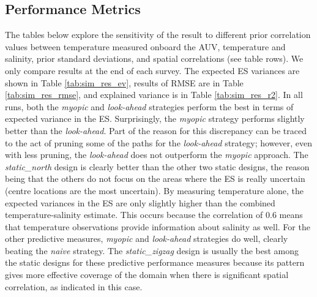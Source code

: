 \documentclass[aoas]{imsart}
\begin{document}
\subsection{Performance Metrics}

The tables below explore the sensitivity of the result to different
prior correlation values between temperature measured onboard the AUV,
temperature and salinity, prior standard deviations, and spatial
correlations (see table rows). We only compare results at the end of
each survey. The expected ES variances are shown in Table
\ref{tab:sim_res_ev}, results of RMSE are in Table
\ref{tab:sim_res_rmse}, and explained variance is in Table
\ref{tab:sim_res_r2}. In all runs, both the \textit{myopic} and
\textit{look-ahead} strategies perform the best in terms of expected
variance in the ES. Surprisingly, the \textit{myopic} strategy
performs slightly better than the \textit{look-ahead}. Part of the
reason for this discrepancy can be traced to the act of pruning some
of the paths for the \textit{look-ahead} strategy; however, even with
less pruning, the \textit{look-ahead} does not outperform the
\textit{myopic} approach. The \textit{static\_north} design is clearly
better than the other two static designs, the reason being that the
others do not focus on the areas where the ES is really uncertain
(centre locations are the most uncertain). By measuring temperature
alone, the expected variances in the ES are only slightly higher than
the combined temperature-salinity estimate. This occurs because the
correlation of $0.6$ means that temperature observations provide
information about salinity as well. For the other predictive measures,
\textit{myopic} and \textit{look-ahead} strategies do well, clearly
beating the \textit{naive} strategy. The \textit{static\_zigzag}
design is usually the best among the static designs for these
predictive performance measures because its pattern gives more
effective coverage of the domain when there is significant spatial
correlation, as indicated in this case.
\end{document}
